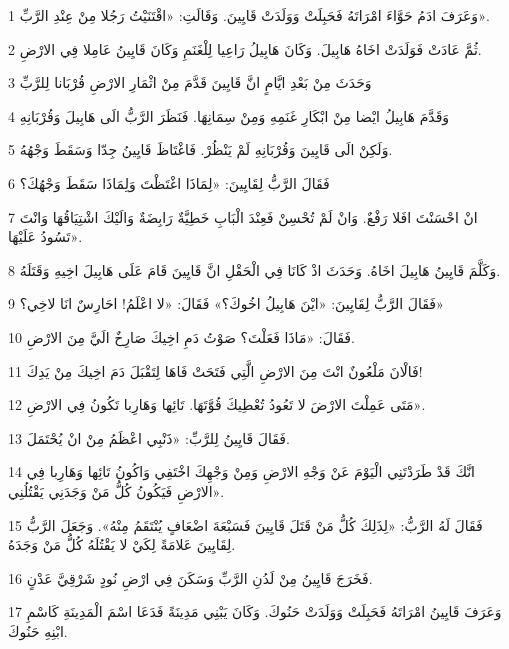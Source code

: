 \par 1 وَعَرَفَ ادَمُ حَوَّاءَ امْرَاتَهُ فَحَبِلَتْ وَوَلَدَتْ قَايِينَ. وَقَالَتِ: «اقْتَنَيْتُ رَجُلا مِنْ عِنْدِ الرَّبِّ».
\par 2 ثُمَّ عَادَتْ فَوَلَدَتْ اخَاهُ هَابِيلَ. وَكَانَ هَابِيلُ رَاعِيا لِلْغَنَمِ وَكَانَ قَايِينُ عَامِلا فِي الارْضِ.
\par 3 وَحَدَثَ مِنْ بَعْدِ ايَّامٍ انَّ قَايِينَ قَدَّمَ مِنْ اثْمَارِ الارْضِ قُرْبَانا لِلرَّبِّ
\par 4 وَقَدَّمَ هَابِيلُ ايْضا مِنْ ابْكَارِ غَنَمِهِ وَمِنْ سِمَانِهَا. فَنَظَرَ الرَّبُّ الَى هَابِيلَ وَقُرْبَانِهِ
\par 5 وَلَكِنْ الَى قَايِينَ وَقُرْبَانِهِ لَمْ يَنْظُرْ. فَاغْتَاظَ قَايِينُ جِدّا وَسَقَطَ وَجْهُهُ.
\par 6 فَقَالَ الرَّبُّ لِقَايِينَ: «لِمَاذَا اغْتَظْتَ وَلِمَاذَا سَقَطَ وَجْهُكَ؟
\par 7 انْ احْسَنْتَ افَلا رَفْعٌ. وَانْ لَمْ تُحْسِنْ فَعِنْدَ الْبَابِ خَطِيَّةٌ رَابِضَةٌ وَالَيْكَ اشْتِيَاقُهَا وَانْتَ تَسُودُ عَلَيْهَا».
\par 8 وَكَلَّمَ قَايِينُ هَابِيلَ اخَاهُ. وَحَدَثَ اذْ كَانَا فِي الْحَقْلِ انَّ قَايِينَ قَامَ عَلَى هَابِيلَ اخِيهِ وَقَتَلَهُ.
\par 9 فَقَالَ الرَّبُّ لِقَايِينَ: «ايْنَ هَابِيلُ اخُوكَ؟» فَقَالَ: «لا اعْلَمُ! احَارِسٌ انَا لاخِي؟»
\par 10 فَقَالَ: «مَاذَا فَعَلْتَ؟ صَوْتُ دَمِ اخِيكَ صَارِخٌ الَيَّ مِنَ الارْضِ.
\par 11 فَالْانَ مَلْعُونٌ انْتَ مِنَ الارْضِ الَّتِي فَتَحَتْ فَاهَا لِتَقْبَلَ دَمَ اخِيكَ مِنْ يَدِكَ!
\par 12 مَتَى عَمِلْتَ الارْضَ لا تَعُودُ تُعْطِيكَ قُوَّتَهَا. تَائِها وَهَارِبا تَكُونُ فِي الارْضِ».
\par 13 فَقَالَ قَايِينُ لِلرَّبِّ: «ذَنْبِي اعْظَمُ مِنْ انْ يُحْتَمَلَ.
\par 14 انَّكَ قَدْ طَرَدْتَنِي الْيَوْمَ عَنْ وَجْهِ الارْضِ وَمِنْ وَجْهِكَ اخْتَفِي وَاكُونُ تَائِها وَهَارِبا فِي الارْضِ فَيَكُونُ كُلُّ مَنْ وَجَدَنِي يَقْتُلُنِي».
\par 15 فَقَالَ لَهُ الرَّبُّ: «لِذَلِكَ كُلُّ مَنْ قَتَلَ قَايِينَ فَسَبْعَةَ اضْعَافٍ يُنْتَقَمُ مِنْهُ». وَجَعَلَ الرَّبُّ لِقَايِينَ عَلامَةً لِكَيْ لا يَقْتُلَهُ كُلُّ مَنْ وَجَدَهُ.
\par 16 فَخَرَجَ قَايِينُ مِنْ لَدُنِ الرَّبِّ وَسَكَنَ فِي ارْضِ نُودٍ شَرْقِيَّ عَدْنٍ.
\par 17 وَعَرَفَ قَايِينُ امْرَاتَهُ فَحَبِلَتْ وَوَلَدَتْ حَنُوكَ. وَكَانَ يَبْنِي مَدِينَةً فَدَعَا اسْمَ الْمَدِينَةِ كَاسْمِ ابْنِهِ حَنُوكَ.
